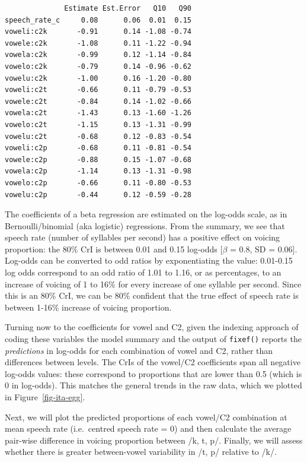 \documentclass[
  authoryear,
  preprint,
  3p]{elsarticle}
\begin{document}
\begin{verbatim}
              Estimate Est.Error   Q10   Q90
speech_rate_c     0.08      0.06  0.01  0.15
voweli:c2k       -0.91      0.14 -1.08 -0.74
vowele:c2k       -1.08      0.11 -1.22 -0.94
vowela:c2k       -0.99      0.12 -1.14 -0.84
vowelo:c2k       -0.79      0.14 -0.96 -0.62
vowelu:c2k       -1.00      0.16 -1.20 -0.80
voweli:c2t       -0.66      0.11 -0.79 -0.53
vowele:c2t       -0.84      0.14 -1.02 -0.66
vowela:c2t       -1.43      0.13 -1.60 -1.26
vowelo:c2t       -1.15      0.13 -1.31 -0.99
vowelu:c2t       -0.68      0.12 -0.83 -0.54
voweli:c2p       -0.68      0.11 -0.81 -0.54
vowele:c2p       -0.88      0.15 -1.07 -0.68
vowela:c2p       -1.14      0.13 -1.31 -0.98
vowelo:c2p       -0.66      0.11 -0.80 -0.53
vowelu:c2p       -0.44      0.12 -0.59 -0.28
\end{verbatim}

The coefficients of a beta regression are estimated on the log-odds
scale, as in Bernoulli/binomial (aka logistic) regressions. From the
summary, we see that speech rate (number of syllables per second) has a
positive effect on voicing proportion: the 80\% CrI is between 0.01 and
0.15 log-odds {[}\(\beta\) = 0.8, SD = 0.06{]}. Log-odds can be
converted to odd ratios by exponentiating the value: 0.01-0.15 log odds
correspond to an odd ratio of 1.01 to 1.16, or as percentages, to an
increase of voicing of 1 to 16\% for every increase of one syllable per
second. Since this is an 80\% CrI, we can be 80\% confident that the
true effect of speech rate is between 1-16\% increase of voicing
proportion.

Turning now to the coefficients for vowel and C2, given the indexing
approach of coding these variables the model summary and the output of
\texttt{fixef()} reports the \emph{predictions} in log-odds for each
combination of vowel and C2, rather than differences between levels. The
CrIs of the vowel/C2 coefficients span all negative log-odds values:
these correspond to proportions that are lower than 0.5 (which is 0 in
log-odds). This matches the general trends in the raw data, which we
plotted in Figure~\ref{fig-ita-egg}.

Next, we will plot the predicted proportions of each vowel/C2
combination at mean speech rate (i.e.~centred speech rate = 0) and then
calculate the average pair-wise difference in voicing proportion between
/k, t, p/. Finally, we will assess whether there is greater
between-vowel variability in /t, p/ relative to /k/.
\end{document}
